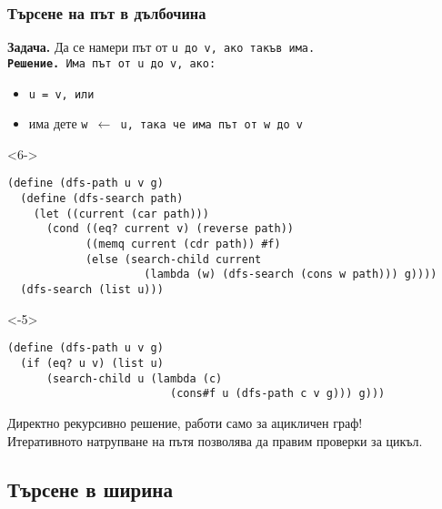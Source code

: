 \documentclass{beamer}
\begin{document}
\begin{frame}[t,fragile]
  \frametitle{Търсене на път в дълбочина}

  \textbf{Задача.} Да се намери път от \tt u до \tt v, ако такъв има.\\
  \pause\onslide<+->
  \textbf{Решение.} Има път от \tt u до \tt v, ако:
  \begin{itemize}
  \item \tt u = \tt v, или
  \item има дете \tt w $\leftarrow$ \tt u, така че има път от \tt w до \tt v
  \end{itemize}
  \vspace{-1em}
  \onslide<+-> \small
    \begin{overlayarea}{\textwidth}{12em}
      \begin{onlyenv}<6->
\begin{lstlisting}
(define (dfs-path u v g)
  (define (dfs-search path)
    (let ((current (car path)))
      (cond ((eq? current v) (reverse path))
            ((memq current (cdr path)) #f)
            (else (search-child current
                     (lambda (w) (dfs-search (cons w path))) g))))
  (dfs-search (list u)))
\end{lstlisting}
      \end{onlyenv}
      \begin{onlyenv}<-5>
\begin{lstlisting}
(define (dfs-path u v g)
  (if (eq? u v) (list u)
      (search-child u (lambda (c)
                         (cons#f u (dfs-path c v g))) g)))
\end{lstlisting}
      \end{onlyenv}
    \end{overlayarea}
    \onslide<+->
    \alert{Директно рекурсивно решение, работи само за ацикличен граф!}\\
    \onslide<+->
    Итеративното натрупване на пътя позволява да правим проверки за цикъл.
\end{frame}

\subsection{Търсене в ширина}
\end{document}
